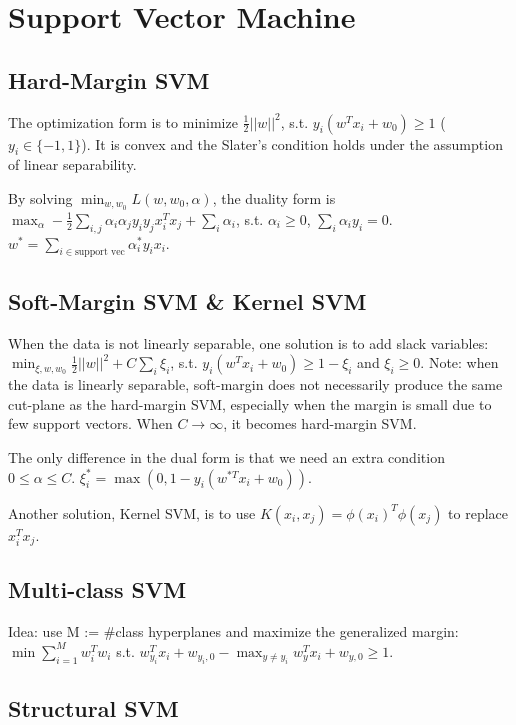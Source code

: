 \section{Support Vector Machine}

\subsection*{Hard-Margin SVM}

The optimization form is to minimize $\frac{1}{2}||w||^2$, s.t. $y_i(w^T x_i+w_0)\ge 1$ ($y_i\in \{-1,1\}$). It is convex and the Slater's condition holds under the assumption of linear separability.

By solving $\min_{w, w_0} L(w, w_0, \alpha)$, the duality form is $\max_\alpha -\frac{1}{2}\sum_{i,j} \alpha_i \alpha_j y_i y_j x_i^T x_j+\sum_i \alpha_i$, s.t. $\alpha_i\ge 0$, $\sum_i \alpha_i y_i = 0$. $w^* = \sum_{i\in \text{support vec}} \alpha_i^* y_i x_i$.

\subsection*{Soft-Margin SVM \& Kernel SVM}

When the data is not linearly separable, one solution is to add slack variables: $\min_{\xi,w,w_0} \frac{1}{2}||w||^2+C\sum_i \xi_i$, s.t. $y_i(w^T x_i+w_0) \ge 1-\xi_i$ and $\xi_i\ge 0$. Note: when the data is linearly separable, soft-margin does not necessarily produce the same cut-plane as the hard-margin SVM, especially when the margin is small due to few support vectors. When $C\rightarrow\infty$, it becomes hard-margin SVM.

The only difference in the dual form is that we need an extra condition $0\le \alpha\le C$. $\xi_i^* = \max(0, 1-y_i(w^{*T}x_i+w_0))$.

Another solution, Kernel SVM, is to use $K(x_i, x_j) = \phi(x_i)^T \phi(x_j)$ to replace $x_i^T x_j$.

\subsection*{Multi-class SVM}

Idea: use M := \#class hyperplanes and maximize the generalized margin: $\min \sum_{i=1}^M w_i^T w_i$ s.t. $w_{y_i}^T x_i + w_{y_i, 0} - \max_{y\ne y_i} w_y^T x_i + w_{y,0} \ge 1$.

\subsection*{Structural SVM}

